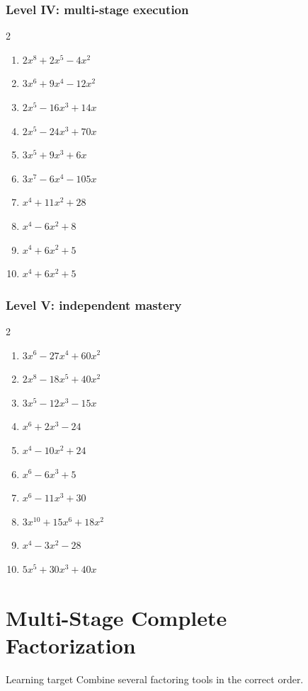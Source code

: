 \documentclass[11pt,oneside]{book}
\begin{document}
\subsection*{Level IV: multi-stage execution}
\begin{multicols}{2}
\begin{enumerate}[leftmargin=*,label=\textbf{\arabic*.},itemsep=0.65\baselineskip]
\item $ 2 x^{8} + 2 x^{5} - 4 x^{2} $
\item $ 3 x^{6} + 9 x^{4} - 12 x^{2} $
\item $ 2 x^{5} - 16 x^{3} + 14 x $
\item $ 2 x^{5} - 24 x^{3} + 70 x $
\item $ 3 x^{5} + 9 x^{3} + 6 x $
\item $ 3 x^{7} - 6 x^{4} - 105 x $
\item $ x^{4} + 11 x^{2} + 28 $
\item $ x^{4} - 6 x^{2} + 8 $
\item $ x^{4} + 6 x^{2} + 5 $
\item $ x^{4} + 6 x^{2} + 5 $
\end{enumerate}
\end{multicols}
\subsection*{Level V: independent mastery}
\begin{multicols}{2}
\begin{enumerate}[leftmargin=*,label=\textbf{\arabic*.},itemsep=0.65\baselineskip]
\item $ 3 x^{6} - 27 x^{4} + 60 x^{2} $
\item $ 2 x^{8} - 18 x^{5} + 40 x^{2} $
\item $ 3 x^{5} - 12 x^{3} - 15 x $
\item $ x^{6} + 2 x^{3} - 24 $
\item $ x^{4} - 10 x^{2} + 24 $
\item $ x^{6} - 6 x^{3} + 5 $
\item $ x^{6} - 11 x^{3} + 30 $
\item $ 3 x^{10} + 15 x^{6} + 18 x^{2} $
\item $ x^{4} - 3 x^{2} - 28 $
\item $ 5 x^{5} + 30 x^{3} + 40 x $
\end{enumerate}
\end{multicols}
\chapter{Multi-Stage Complete Factorization}
\begin{rulebox}{Learning target}
Combine several factoring tools in the correct order.
\end{rulebox}
\end{document}

